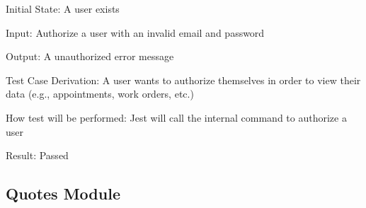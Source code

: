\documentclass[12pt, titlepage]{article}
\begin{document}
\begin{enumerate}
	      Initial State: A user exists

	      Input: Authorize a user with an invalid email and password

	      Output: A unauthorized error message

	      Test Case Derivation: A user wants to authorize themselves in order to view their data (e.g.,
	      appointments, work orders, etc.)

	      How test will be performed: Jest will call the internal command to authorize a user

	      Result: Passed

\end{enumerate}

\subsection{Quotes Module}
\end{document}
